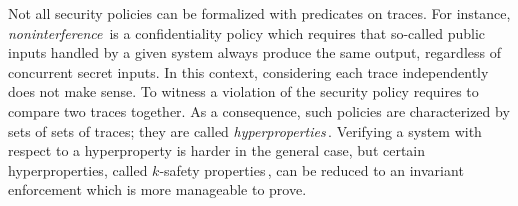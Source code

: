 Not all security policies can be formalized with predicates on traces.
%
For instance, \emph{noninterference}\,\cite{goguen1982security} is a
confidentiality policy which requires that so-called public inputs handled by a
given system always produce the same output, regardless of concurrent secret
inputs.
%
In this context, considering each trace independently does not make sense.
%
To witness a violation of the security policy requires to compare two traces
together.
%
As a consequence, such policies are characterized by sets of sets of traces;
they are called \emph{hyperproperties}\,\cite{marr2002hypertheading}.
%
Verifying a system with respect to a hyperproperty is harder in the general
case, but certain hyperproperties, called \( k \)-safety
properties\,\cite{marr2002hypertheading}, can be reduced to an invariant
enforcement which is more manageable to prove.
%

%


